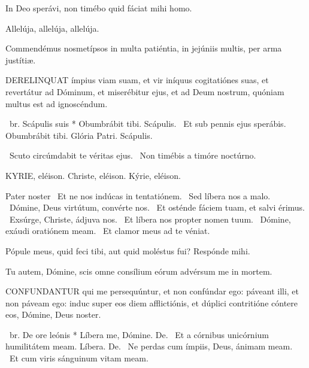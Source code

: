   In Deo sperávi, non timébo quid fáciat mihi homo.

  Allelúja, allelúja, allelúja.



 Commendémus nosmetípsos in multa patiéntia, in jejúniis multis, per arma justítiæ.


\lettrine[lines=2]{D}{ERELINQUAT} ímpius viam suam, et vir iníquus cogitatiónes suas, et revertátur ad Dóminum, et miserébitur ejus, et ad Deum nostrum, quóniam multus est ad ignoscéndum.

\R\ br. Scápulis suis * Obumbrábit tibi. Scápulis. \V\ Et sub pennis ejus sperábis. Obumbrábit tibi. Glória Patri. Scápulis.

\V\ Scuto circúmdabit te véritas ejus. \R\ Non timébis a timóre noctúrno.


KYRIE, eléison. Christe, eléison. Kýrie, eléison.

Pater noster  \V\ Et ne nos indúcas in tentatiónem. \R\ Sed líbera nos a malo. \V\ Dómine, Deus virtútum, convérte nos. \R\ Et osténde fáciem tuam, et salvi érimus. \V\ Exsúrge, Christe, ádjuva nos. \R\ Et líbera nos propter nomen tuum. \V\ Dómine, exáudi oratiónem meam. \R\ Et clamor meus ad te véniat.




 Pópule meus, quid feci tibi, aut quid moléstus fui? Respónde mihi.


 Tu autem, Dómine, scis omne consílium eórum advérsum me in mortem.


\lettrine[lines=2]{C}{ONFUNDANTUR} qui me persequúntur, et non confúndar ego: páveant illi, et non páveam ego: induc super eos diem afflictiónis, et dúplici contritióne cóntere eos, Dómine, Deus noster.

\R\ br. De ore leónis * Líbera me, Dómine. De. \V\ Et a córnibus unicórnium humilitátem meam. Líbera. De. \V\ Ne perdas cum ímpiis, Deus, ánimam meam. \R\ Et cum viris sánguinum vitam meam.


